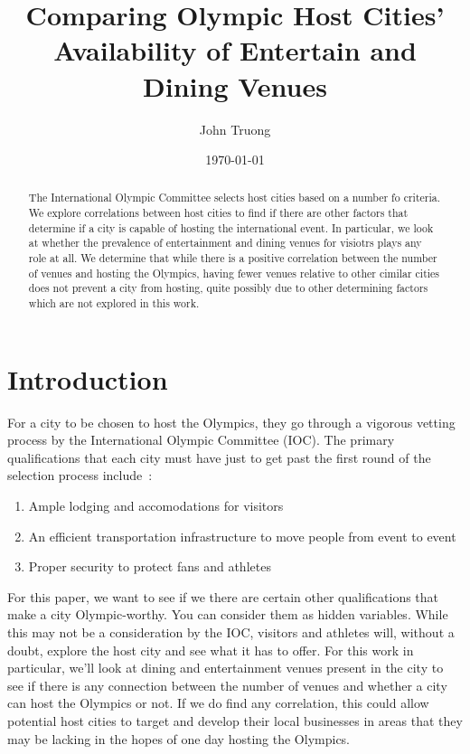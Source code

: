 \documentclass[
 reprint,
 amsmath,amssymb,
 aps,
prb,
floatfix
]{revtex4-2}
\begin{document}

\title{Comparing Olympic Host Cities' Availability of Entertain and Dining Venues}

\author{John Truong}

\date{\today}

\begin{abstract}
    The International Olympic Committee selects host cities based on a number fo criteria. We explore correlations between host cities to find if there are other factors that determine if a city is capable of hosting the international event. In particular, we look at whether the prevalence of entertainment and dining venues for visiotrs plays any role at all. We determine that while there is a positive correlation between the number of venues and hosting the Olympics, having fewer venues relative to other cimilar cities does not prevent a city from hosting, quite possibly due to other determining factors which are not explored in this work.
\end{abstract}

\maketitle

\section{Introduction}
    For a city to be chosen to host the Olympics, they go through a vigorous vetting process by the International Olympic Committee (IOC). The primary qualifications that each city must have just to get past the first round of the selection process include~\cite{chepkemoi_how_2018}:
    \begin{enumerate}
        \item Ample lodging and accomodations for visitors
        \item An efficient transportation infrastructure to move people from event to event
        \item Proper security to protect fans and athletes
    \end{enumerate}
    For this paper, we want to see if we there are certain other qualifications that make a city Olympic-worthy. You can consider them as hidden variables. While this may not be a consideration by the IOC, visitors and athletes will, without a doubt, explore the host city and see what it has to offer. For this work in particular, we'll look at dining and entertainment venues present in the city to see if there is any connection between the number of venues and whether a city can host the Olympics or not. If we do find any correlation, this could  allow potential host cities to target and develop their local businesses in areas that they may be lacking in the hopes of one day hosting the Olympics.
\end{document}
